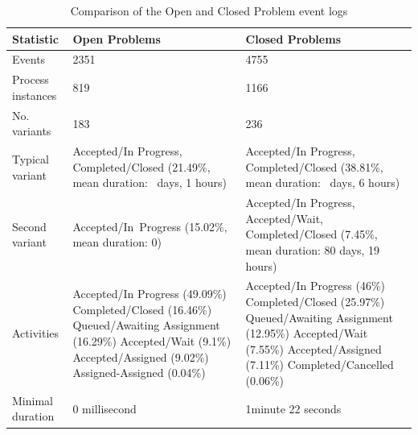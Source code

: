 \documentclass[lnbip]{svmultln}
\begin{document}
\begin{table}
\caption{Comparison of the Open and Closed Problem event logs}
\label{tab:comparisonOpenClosedProblems}
\begin{center}
\begin{tabular}{p{}p{}p{}}
Statistic	& Open Problems	& Closed Problems \\[2pt]
\hline\rule{0pt}{12pt}
Events	& 2351	& 4755 \\
Process instances	&819	& 1166 \\
No. variants	& 183	& 236 \\
Typical variant	& 
	Accepted/In Progress, \newline Completed/Closed \newline 
		(21.49\%, mean duration: \newline 49~days, 1 hours)	& 
	Accepted/In Progress, \newline Completed/Closed \newline 
		(38.81\%, mean duration: \newline 49~days, 6 hours) \\
Second variant	& 
	Accepted/In~Progress \newline 
		(15.02\%, mean duration: 0)	&
	Accepted/In Progress, \newline 
		Accepted/Wait, \newline 
		Completed/Closed \newline 
		(7.45\%, mean duration: 80 days, 19 hours) \\
Activities &
	Accepted/In Progress (49.09\%) \newline 
		Completed/Closed (16.46\%) \newline 
		Queued/Awaiting Assignment (16.29\%) \newline
		Accepted/Wait (9.1\%) \newline
		Accepted/Assigned (9.02\%) \newline
		Assigned-Assigned (0.04\%)	&
	Accepted/In Progress (46\%) \newline
		Completed/Closed (25.97\%) \newline
		Queued/Awaiting Assignment \newline (12.95\%) \newline
		Accepted/Wait (7.55\%) \newline
		Accepted/Assigned (7.11\%) \newline
		Completed/Cancelled (0.06\%) \\
Minimal duration	& 0 millisecond	& 1minute 22 seconds \\

\end{tabular}
\end{center}
\end{table}
\end{document}
